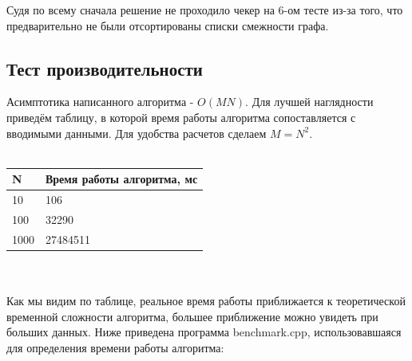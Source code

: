 \documentclass[12pt]{article}
\begin{document}
Судя по всему сначала решение не проходило чекер на 6-ом тесте из-за того, что предварительно не были отсортированы списки смежности графа.

\subsection*{Тест производительности}
Асимптотика написанного алгоритма - $O(MN)$.
Для лучшей наглядности приведём таблицу, в которой время работы алгоритма сопоставляется с вводимыми данными. Для удобства расчетов сделаем $M = N^2$.
\\
\\
\begin{tabularx}{\textwidth}{ |X|X| }
    \hline
    N & Время работы алгоритма, мс \\
    \hline
    10 & 106 \\
    100 & 32290 \\
    1000 & 27484511 \\
    \hline
\end{tabularx}
\\
\\
Как мы видим по таблице, реальное время работы приближается к теоретической временной сложности алгоритма, большее приближение можно увидеть при больших данных. 
Ниже приведена программа benchmark.cpp, использовавшаяся для определения времени работы алгоритма:
\end{document}
